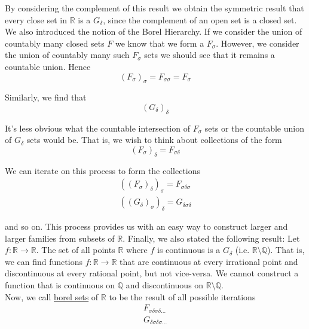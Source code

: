 \documentclass[12pt]{article}
\newlength\tindent
\renewcommand{\indent}{\hspace*{\tindent}}
\newcommand{\R}{\mathbb R}
\newcommand{\Q}{\mathbb Q}
\begin{document}
\indent By considering the complement of this result we obtain the symmetric result that every close set in $\R$ is a $G_\delta$, since the complement of an open set is a closed set. \\

\indent We also introduced the notion of the Borel Hierarchy. If we consider the union of countably many closed sets $F$ we know that we form a $F_\sigma$. However, we consider the union of countably many such $F_\sigma$ sets we should see that it remains a countable union. Hence
\begin{equation*}
	(F_\sigma)_\sigma = F_{\sigma\sigma} = F_\sigma
\end{equation*}

Similarly, we find that
\begin{equation*}
	(G_\delta)_\delta
\end{equation*}

\indent It's less obvious what the countable intersection of $F_\sigma$ sets or the countable union of $G_\delta$ sets would be. That is, we wish to think about collections of the form
\begin{equation*}
	(F_\sigma)_\delta = F_{\sigma\delta}
\end{equation*}

We can iterate on this process to form the collections
\begin{align*}
	((F_\sigma)_\delta)_\sigma = F_{\sigma\delta\sigma} \\
	((G_\delta)_\sigma)_\delta = G_{\delta\sigma\delta}
\end{align*}

and so on. This process provides us with an easy way to construct larger and larger families from subsets of $\R$. Finally, we also stated the following result: Let $f:\R\to\R$. The set of all points $\R$ where $f$ is continuous is a $G_\delta$ (i.e. $\R\setminus\Q$). That is, we can find functions $f:\R\to\R$ that are continuous at every irrational point and discontinuous at every rational point, but not vice-versa. We cannot construct a function that is continuous on $\Q$ and discontinuous on $\R\setminus\Q$. \\

Now, we call \underline{borel sets} of $\R$ to be the result of all possible iterations
\begin{align*}
	F_{\sigma\delta\sigma\delta...} \\
	G_{\delta\sigma\delta\sigma...}
\end{align*}
\end{document}
